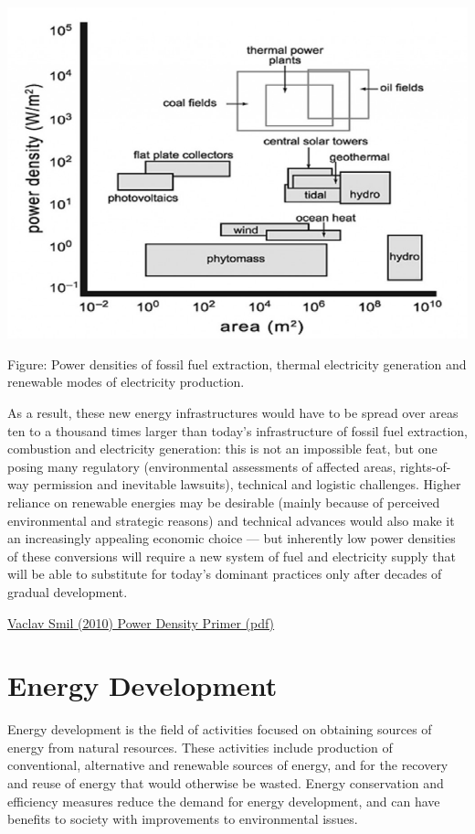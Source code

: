 \documentclass[
]{book}
\begin{document}
\includegraphics{fig/smil_power_densities.png}

Figure: Power densities of fossil fuel extraction, thermal electricity
generation and renewable modes of electricity production.

As a result, these new energy infrastructures would have to be spread over areas ten to a
thousand times larger than today's infrastructure of fossil fuel extraction, combustion and
electricity generation: this is not an impossible feat, but one posing many regulatory
(environmental assessments of affected areas, rights-of-way permission and inevitable lawsuits),
technical and logistic challenges. Higher reliance on renewable energies may be desirable
(mainly because of perceived environmental and strategic reasons) and technical advances
would also make it an increasingly appealing economic choice --- but inherently low power
densities of these conversions will require a new system of fuel and electricity supply that will be
able to substitute for today's dominant practices only after decades of gradual development.

\href{pdf/smil_2010_power_density_primer.pdf}{Vaclav Smil (2010) Power Density Primer (pdf)}

\hypertarget{energy-development}{%
\chapter{Energy Development}\label{energy-development}}

Energy development is the field of activities focused on obtaining sources of energy from natural resources. These activities include production of conventional, alternative and renewable sources of energy, and for the recovery and reuse of energy that would otherwise be wasted. Energy conservation and efficiency measures reduce the demand for energy development, and can have benefits to society with improvements to environmental issues.
\end{document}
